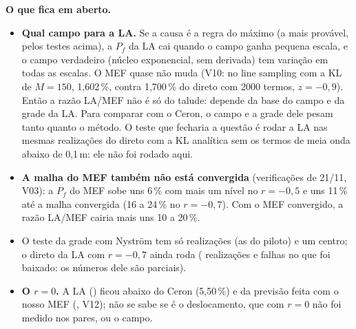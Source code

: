 \documentclass[11pt,a4paper]{article}
\begin{document}
\textbf{O que fica em aberto.}
\begin{itemize}
  \item \textbf{Qual campo para a LA.} Se a causa é a regra do máximo (a mais provável, pelos testes acima), a $P_f$ da
    LA cai quando o campo ganha pequena escala, e o campo verdadeiro (núcleo exponencial, sem derivada) tem variação em
    todas as escalas. O MEF quase não muda (V10: no
    line sampling com a KL de $M = 150$, 1,602\,\%, contra 1,700\,\% do direto com 2000 termos, $z = -0{,}9$). Então a
    razão LA/MEF não é só do talude: depende da base do campo e da grade da LA. Para comparar com o Ceron, o campo e a
    grade dele pesam tanto quanto o método. O teste que fecharia a questão é rodar a LA nas mesmas realizações do
    direto com a KL analítica sem os termos de meia onda abaixo de 0,1\,m: ele não foi rodado aqui.
  \item \textbf{A malha do MEF também não está convergida} (verificações de 21/11, V03): a $P_f$ do MEF sobe uns 6\,\%
    com mais um nível no $r = -0{,}5$ e uns 11\,\% até a malha convergida (16 a 24\,\% no $r = -0{,}7$). Com o MEF
    convergido, a razão LA/MEF cairia mais uns 10 a 20\,\%.
  \item O teste da grade com Nyström tem só \lmGradeNyN{} realizações (as do piloto) e um centro; o direto da LA com
    $r = -0{,}7$ ainda roda (\lmDirRbN{} realizações e \lmDirRbFal{} falhas no que foi baixado: os números dele são
    parciais).
  \item \textbf{O $r = 0$.} A LA (\lmDirZPf) ficou abaixo do Ceron (5,50\,\%) e da previsão feita com o nosso MEF
    (\lmZprevV, V12); não se sabe se é o deslocamento, que com $r = 0$ não foi medido nos pares, ou o campo.
\end{itemize}
\end{document}
